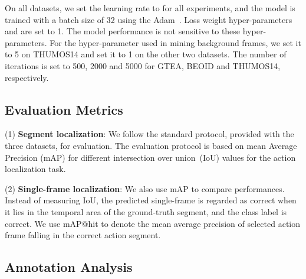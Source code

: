 \documentclass[runningheads]{llncs}
\begin{document}
	On all datasets, we set the learning rate to  for all experiments, and the model is trained with a batch size of 32 using the Adam~\cite{kingma2014adam}.
	Loss weight hyper-parameters  and  are set to 1.
	The model performance is not sensitive to these hyper-parameters. 
	For the hyper-parameter  used in mining background frames, we set it to 5 on THUMOS14 and set it to 1 on the other two datasets. The number of iterations is set to 500, 2000 and 5000 for GTEA, BEOID and THUMOS14, respectively. 
	
	
	\subsection{Evaluation Metrics}
	
	(1) \textbf{Segment localization}: We follow the standard protocol, provided with the three datasets, for evaluation.
	The evaluation protocol is based on mean Average Precision (mAP) for different intersection over union~(IoU) values for the action localization task.
	
	\noindent(2) \textbf{Single-frame localization}: We also use mAP to compare performances. Instead of measuring IoU, the predicted single-frame is regarded as correct when it lies in the temporal area of the ground-truth segment, and the class label is correct. We use mAP@hit to denote the mean average precision of selected action frame falling in the correct action segment.
	
	


	
	


	
	
	
	
	
	\subsection{Annotation Analysis}






	
	
\end{document}
